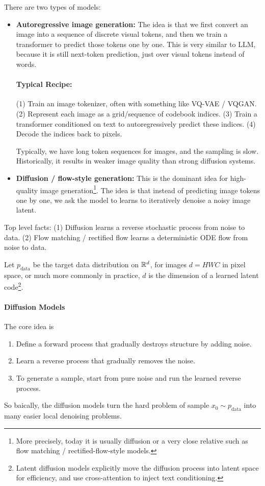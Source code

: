 \documentclass[11pt]{article}  %
\begin{document}
There are two types of models:
\begin{itemize}
  \item \textbf{Autoregressive image generation:} The idea is that we first convert an image into a sequence of discrete visual tokens, and then we train a transformer to predict those tokens one by one.
  This is very similar to LLM, because it is still next-token prediction, just over visual tokens instead of words.

  \paragraph{Typical Recipe:} (1) Train an image tokenizer, often with something like VQ-VAE / VQGAN. (2) Represent each image as a grid/sequence of codebook indices. (3) Train a transformer conditioned on text to autoregressively predict these indices. (4) Decode the indices back to pixels.

  Typically, we have long token sequences for images, and the sampling is slow. Historically, it results in weaker image quality than strong diffusion systems.

  \item \textbf{Diffusion / flow-style generation:} This is the dominant idea for high-quality image generation\footnote{More precisely, today it is usually diffusion or a very close relative such as flow matching / rectified-flow-style models.}.
  The idea is that instead of predicting image tokens one by one, we ask the model to learns to iteratively denoise a noisy image latent.
\end{itemize}


Top level facts: (1) Diffusion learns a reverse stochastic process from noise to data. (2) Flow matching / rectified flow learns a deterministic ODE flow from noise to data.

Let $p_{\text{data}}$ be the target data distribution on $\mathbb{R}^d$, for images $d = HWC$ in pixel space, or much more commonly in practice, $d$ is the dimension of a learned latent code\footnote{Latent diffusion models explicitly move the diffusion process into latent space for efficiency, and use cross-attention to inject text conditioning.}.

\paragraph{Diffusion Models}
The core idea is 
\begin{enumerate}
  \item Define a forward process that gradually destroys structure by adding noise.
  \item Learn a reverse process that gradually removes the noise.
  \item To generate a sample, start from pure noise and run the learned reverse process.
\end{enumerate}
So baically, the diffusion models turn the hard problem of sample $x_0 \sim p_{\text{data}}$ into many easier local denoising problems.
\end{document}
